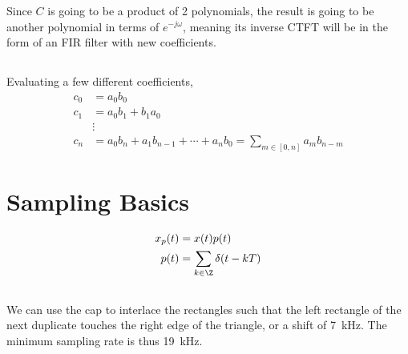 \documentclass{article}
\begin{document}
\subsubsection{}

Since \(C\) is going to be a product of 2 polynomials, the result is going to be another polynomial in terms of \(e^{-j \omega}\), meaning its inverse CTFT will be in the form of an FIR filter with new coefficients.

\subsection{}

Evaluating a few different coefficients,
\begin{align}
    c_0 &= a_0 b_0 \\
    c_1 &= a_0 b_1 + b_1 a_0 \\
    &\vdots \\
    c_n &= a_0 b_n + a_1 b_{n - 1} + \cdots + a_n b_0 = \sum_{m \in [0, n]} a_m b_{n - m}
\end{align}

\section{Sampling Basics}

\begin{align}
    x_p(t) &= x(t) p(t) \\
    p(t) &= \sum_{k \in \Z} \delta(t - kT)
\end{align}

\subsection{}

We can use the cap to interlace the rectangles such that the left rectangle of the next duplicate touches the right edge of the triangle, or a shift of \SI{7}{\kilo\hertz}.
The minimum sampling rate is thus \SI{19}{\kilo\hertz}.

\subsection{}
\end{document}
